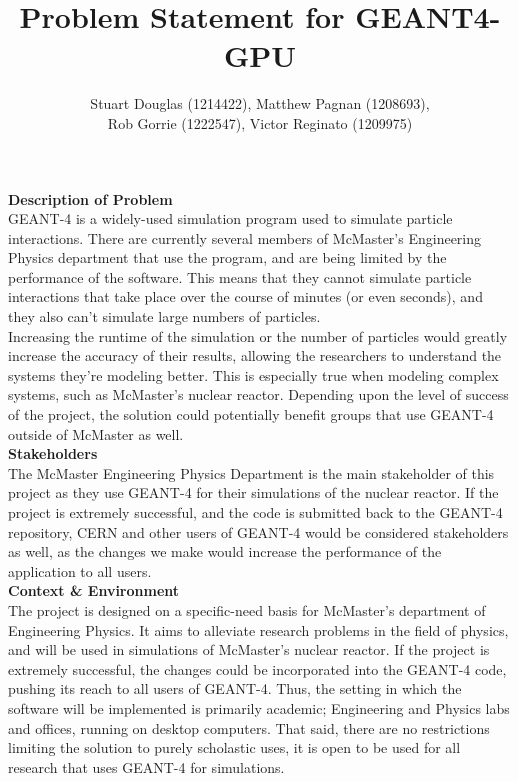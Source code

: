 \documentclass[12pt]{article}
\begin{document}
\title{\vspace{-4em}Problem Statement for GEANT4-GPU} \author{Stuart Douglas
(1214422), Matthew Pagnan (1208693), \\ Rob Gorrie (1222547), Victor Reginato
(1209975)}
	
\maketitle


\noindent \textbf{Description of Problem}\\ GEANT-4 is a widely-used simulation
program used to simulate particle interactions. There are currently several
members of McMaster's Engineering Physics department that use the program, and
are being limited by the performance of the software. This means that they
cannot simulate particle interactions that take place over the course of minutes
(or even seconds), and they also can't simulate large numbers of particles.\\

\noindent Increasing the runtime of the simulation or the number of particles
would greatly increase the accuracy of their results, allowing the researchers
to understand the systems they're modeling better. This is especially true when
modeling complex systems, such as McMaster's nuclear reactor. Depending upon the
level of success of the project, the solution could potentially benefit groups
that use GEANT-4 outside of McMaster as well.\\

\noindent \textbf{Stakeholders}\\ The McMaster Engineering Physics Department is
the main stakeholder of this project as they use GEANT-4 for their simulations
of the nuclear reactor. If the project is extremely successful, and the code is submitted back to the GEANT-4 repository, CERN and other users of GEANT-4 would be considered stakeholders as well, as the changes we make would increase the performance of the application to all users.\\

\noindent \textbf{Context \& Environment}\\ The project is designed on a 
specific-need basis for McMaster's department of Engineering Physics. It aims to alleviate research problems in the field of physics, and will be used in simulations of McMaster's nuclear reactor. If the project is extremely successful, the changes could be incorporated into the GEANT-4 code, pushing its reach to all users of GEANT-4. Thus, the setting in which the software will be implemented is primarily academic; Engineering and Physics labs and offices, running on desktop computers. That said, there are no restrictions limiting the solution to purely scholastic uses, it is open to be used for all research that uses GEANT-4 for simulations.\\
 
\end{document}
